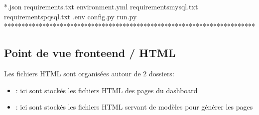 \documentclass[letterpaper,10pt,french]{sphinxmanual}
\begin{document}
\begin{sphinxVerbatim}[commandchars=\\\{\}]
    \PYGZhy{}\PYGZhy{} *.json
\PYGZhy{}\PYGZhy{} requirements.txt                          
\PYGZhy{}\PYGZhy{} environment.yml                           
\PYGZhy{}\PYGZhy{} requirements\PYGZhy{}mysql.txt                    
\PYGZhy{}\PYGZhy{} requirements\PYGZhy{}pqsql.txt                    
\PYGZhy{}\PYGZhy{} .env                                      
\PYGZhy{}\PYGZhy{} config.py                                 
\PYGZhy{}\PYGZhy{} run.py                                    
\PYGZhy{}\PYGZhy{} ************************************************************************
\end{sphinxVerbatim}


\subsection{Point de vue fronte\sphinxhyphen{}end / HTML}
\label{\detokenize{infrastructure:point-de-vue-fronte-end-html}}
\sphinxAtStartPar
Les fichiers HTML sont organisées autour de 2 dossiers:
\begin{itemize}
\item {} 
\sphinxAtStartPar
{} : ici sont stockés les fichiers HTML des pages du dashboard

\item {} 
\sphinxAtStartPar
{} : ici sont stockés les fichiers HTML servant de modèles pour générer les pages

\end{itemize}
\end{document}
